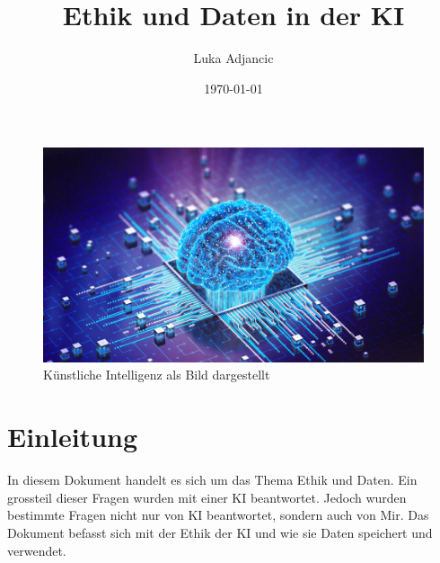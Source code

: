 \documentclass{report}
\title{Ethik und Daten in der KI}
\author{Luka Adjancic}
\date{\today}
\begin{document}
\begin{figure}
    \centering
    \includegraphics[width=1\textwidth]{AI.jpg}
    \caption{Künstliche Intelligenz als Bild dargestellt}
    \label{fig:AI}
\end{figure}

\maketitle

\tableofcontents

\chapter{Einleitung}

In diesem Dokument handelt es sich um das Thema Ethik und Daten. Ein grossteil dieser Fragen wurden mit einer KI beantwortet. Jedoch wurden bestimmte Fragen nicht nur von KI beantwortet, sondern auch von Mir. Das Dokument befasst sich mit der Ethik der KI und wie sie Daten speichert und verwendet. 







\printbibliography

\nocite{*}

\listoffigures
\end{document}
